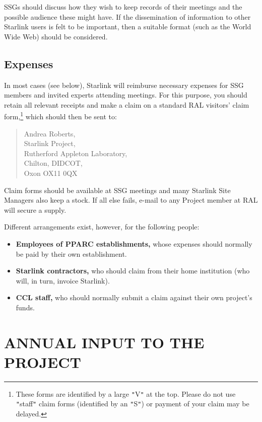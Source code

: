 \documentclass[11pt]{article}
\newcommand{\htmladdnormallink}[2]{#1}
\newcommand{\xlabel}[1]{}
\newcommand{\staffref}[1]{\htmladdnormallink{#1}{http://star-www.rl.ac.uk/pro.html}}
\newcommand{\ralref}[1]{\htmladdnormallink{#1}{http://www.clrc.ac.uk/ral/index.html}}
\newcommand{\cclref}[1]{\htmladdnormallink{#1}{http://www.clrc.ac.uk/}}
\newcommand{\qt}[1]{``#1''}
\renewcommand{\qt}[1]{{\tt{"}}#1{\tt{"}}}
\begin{document}
SSGs should discuss how they wish to keep records of their meetings
and the possible audience these might have. If the dissemination of
information to other Starlink users is felt to be important, then a
suitable format (such as the World Wide Web) should be considered.

\subsection{Expenses}

In most cases (see below), Starlink will reimburse necessary expenses
for SSG members and invited experts attending meetings. For this
purpose, you should retain all relevant receipts and make a claim on a
standard \ralref{RAL} visitors' claim form,\footnote{These forms are
identified by a large \qt{V} at the top. Please do not use \qt{staff}
claim forms (identified by an \qt{S}) or payment of your claim may be
delayed.}  which should then be sent to:

\begin{quote}
Andrea Roberts,\\
Starlink Project,\\
Rutherford Appleton Laboratory,\\
Chilton, DIDCOT,\\
Oxon OX11 0QX
\end{quote}

Claim forms should be available at SSG meetings and many Starlink Site
Managers also keep a stock. If all else fails, e-mail to any
\staffref{Project member} at RAL will secure a supply.

Different arrangements exist, however, for the following people:

\begin{itemize}

\item {\bf Employees of PPARC establishments,} whose expenses should
normally be paid by their own establishment.

\item {\bf Starlink contractors,} who should claim from their home
institution (who will, in turn, invoice Starlink).

\item {\bf \cclref{CCL} staff,} who should normally submit a claim
against their own project's funds.

\end{itemize}

\section{\xlabel{annual_input}ANNUAL INPUT TO THE PROJECT}
\end{document}
